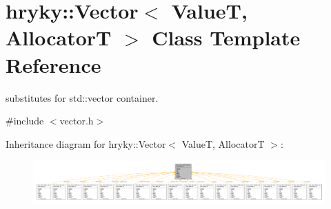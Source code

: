 \hypertarget{classhryky_1_1_vector}{\section{hryky\-:\-:Vector$<$ Value\-T, Allocator\-T $>$ Class Template Reference}
\label{classhryky_1_1_vector}
}


substitutes for std\-::vector container.  




{\ttfamily \#include $<$vector.\-h$>$}



Inheritance diagram for hryky\-:\-:Vector$<$ Value\-T, Allocator\-T $>$\-:
\nopagebreak
\begin{figure}[H]
\begin{center}
\leavevmode
\includegraphics[width=350pt]{classhryky_1_1_vector__inherit__graph}
\end{center}
\end{figure}
